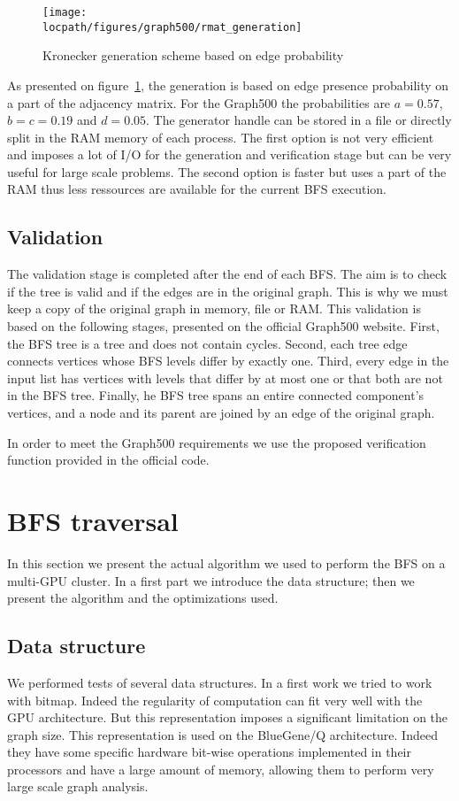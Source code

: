 \begin{figure}[!t]
	\centering
	\texttt{[image: \\locpath/figures/graph500/rmat\_generation]}
	\caption{Kronecker generation scheme based on edge probability}
	\label{fig:kron_gen_scheme}
\end{figure}

As presented on figure~\ref{fig:kron_gen_scheme}, the generation is based on edge presence probability on a part of the adjacency matrix. 
For the Graph500 the probabilities are $a = 0.57$, $b = c = 0.19$ and $d = 0.05$.
The generator handle can be stored in a file or directly split in the RAM memory of each process. 
The first option is not very efficient and imposes a lot of I/O for the generation and verification stage but can be very useful for large scale problems.
The second option is faster but uses a part of the RAM thus less ressources are available for the current BFS execution.


\subsection{Validation}
The validation stage is completed after the end of each BFS. 
The aim is to check if the tree is valid and if the edges are in the original graph.
 This is why we must keep a copy of the original graph in memory, file or RAM. 
This validation is based on the following stages, presented on the official Graph500 website.
First, the BFS tree is a tree and does not contain cycles.
Second, each tree edge connects vertices whose BFS levels differ by exactly one.
Third, every edge in the input list has vertices with levels that differ by at most one or that both are not in the BFS tree.
Finally, he BFS tree spans an entire connected component's vertices, and
a node and its parent are joined by an edge of the original graph.

In order to meet the Graph500 requirements we use the proposed verification function provided in the official code.

\section{BFS traversal}
In this section we present the actual algorithm we used to perform the BFS on a multi-GPU cluster. 
In a first part we introduce the data structure; then we present the algorithm and the optimizations used.

\subsection{Data structure}
We performed tests of several data structures.
In a first work we tried to work with bitmap. Indeed the regularity of computation can fit very well with the GPU architecture. But this representation imposes a significant limitation on the graph size. 
This representation is used on the BlueGene/Q architecture. 
Indeed they have some specific hardware bit-wise operations implemented in their processors and have a large amount of memory, allowing them to perform very large scale graph analysis. 


